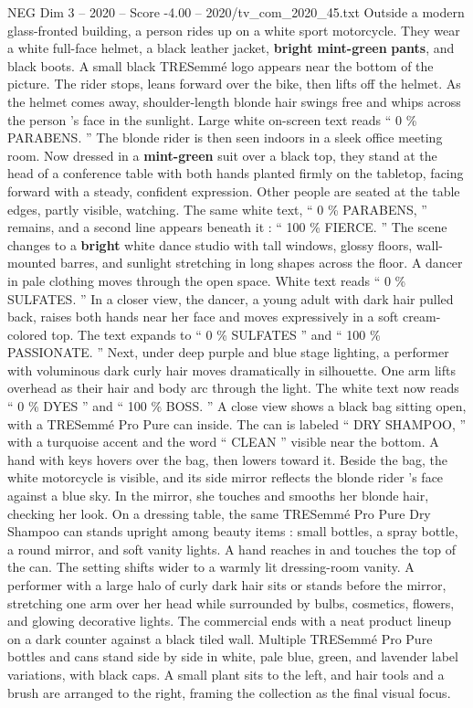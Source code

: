 \begin{textsample}{NEG Dim 3 – 2020 – Score -4.00 – 2020/tv\_com\_2020\_45.txt}  \label{ex:f3_neg_022}
Outside a modern glass-fronted building, a person rides up on a white sport motorcycle.
They wear a white full-face helmet, a black leather jacket, \textbf{bright} \textbf{mint-green} \textbf{pants}, and black boots.
A small black TRESemmé logo appears near the bottom of the picture.
The rider stops, leans forward over the bike, then lifts off the helmet.
As the helmet comes away, shoulder-length blonde hair swings free and whips across the person ’s face in the sunlight.
Large white on-screen text reads “ 0 \% PARABENS. ” The blonde rider is then seen indoors in a sleek office meeting room.
Now dressed in a \textbf{mint-green} suit over a black top, they stand at the head of a conference table with both hands planted firmly on the tabletop, facing forward with a steady, confident expression.
Other people are seated at the table edges, partly visible, watching.
The same white text, “ 0 \% PARABENS, ” remains, and a second line appears beneath it : “ 100 \% FIERCE. ” The scene changes to a \textbf{bright} white dance studio with tall windows, glossy floors, wall-mounted barres, and sunlight stretching in long shapes across the floor.
A dancer in pale clothing moves through the open space.
White text reads “ 0 \% SULFATES. ” In a closer view, the dancer, a young adult with dark hair pulled back, raises both hands near her face and moves expressively in a soft cream-colored top.
The text expands to “ 0 \% SULFATES ” and “ 100 \% PASSIONATE. ” Next, under deep purple and blue stage lighting, a performer with voluminous dark curly hair moves dramatically in silhouette.
One arm lifts overhead as their hair and body arc through the light.
The white text now reads “ 0 \% DYES ” and “ 100 \% BOSS. ” A close view shows a black bag sitting open, with a TRESemmé Pro Pure can inside.
The can is labeled “ DRY SHAMPOO, ” with a turquoise accent and the word “ CLEAN ” visible near the bottom.
A hand with keys hovers over the bag, then lowers toward it.
Beside the bag, the white motorcycle is visible, and its side mirror reflects the blonde rider ’s face against a blue sky.
In the mirror, she touches and smooths her blonde hair, checking her look.
On a dressing table, the same TRESemmé Pro Pure Dry Shampoo can stands upright among beauty items : small bottles, a spray bottle, a round mirror, and soft vanity lights.
A hand reaches in and touches the top of the can.
The setting shifts wider to a warmly lit dressing-room vanity.
A performer with a large halo of curly dark hair sits or stands before the mirror, stretching one arm over her head while surrounded by bulbs, cosmetics, flowers, and glowing decorative lights.
The commercial ends with a neat product lineup on a dark counter against a black tiled wall.
Multiple TRESemmé Pro Pure bottles and cans stand side by side in white, pale blue, green, and lavender label variations, with black caps.
A small plant sits to the left, and hair tools and a brush are arranged to the right, framing the collection as the final visual focus.

\end{textsample}
